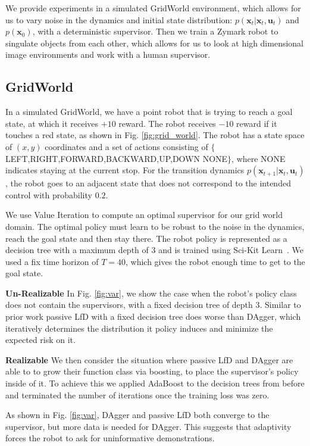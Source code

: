 \documentclass[10pt, conference]{ieeeconf}      %
\newcommand{\bu}{\mathbf{u}}
\newcommand{\bx}{\mathbf{x}}
\begin{document}
We provide experiments in a simulated GridWorld environment, which allows for us to vary noise in the dynamics and initial state distribution: $p(\bx_t|\bx_t,\bu_t)$ and $p(\bx_0)$, with a deterministic supervisor. Then we  train a Zymark robot to singulate objects from each other, which allows for us to look at high dimensional image environments and work with a human supervisor. 

\subsection{GridWorld}\label{sec:gdw}
In a simulated GridWorld, we have a point robot that is trying to reach a goal state, at which it receives $+10$ reward. The robot receives $-10$ reward if it touches a red state, as shown in Fig. \ref{fig:grid_world}. The robot has a state space of $(x,y)$ coordinates and a set of actions consisting of $\lbrace$LEFT,RIGHT,FORWARD,BACKWARD,UP,DOWN NONE$\rbrace$, where NONE indicates staying at the current stop. For the transition dynamics $p(\bx_{t+1}|\bx_{t},\bu_t)$, the robot goes to an adjacent state that does not correspond to the intended control with probability $0.2$. 

We use Value Iteration to compute an optimal supervisor for our grid world domain. The optimal policy must learn to be robust to the noise in the dynamics, reach the goal state and then stay there. The robot policy is represented as a decision tree with a maximum depth of $3$ and is trained using Sci-Kit Learn~\cite{scikit-learn}. We used a fix time horizon of $T=40$, which gives the robot enough time to get to the goal state. 


\noindent \textbf{Un-Realizable} In Fig. \ref{fig:var}, we show the case when the robot's policy class does not contain the supervisors, with a fixed decision tree of depth 3.  Similar to prior work passive LfD  with a fixed decision tree does worse than DAgger, which iteratively determines the distribution it policy induces and minimize the expected risk on it.

\noindent \textbf{Realizable} 
We then consider the situation where passive LfD and DAgger are able to to grow their function class via boosting, to place the supervisor's policy inside of it. To achieve this we applied AdaBoost to the decision trees from before and terminated the number of iterations once the training loss was zero. 

As shown in Fig. \ref{fig:var}, DAgger and passive LfD both converge to the supervisor, but more data is needed for DAgger. This suggests that adaptivity forces the robot to ask for uninformative demonstrations.  
\end{document}
